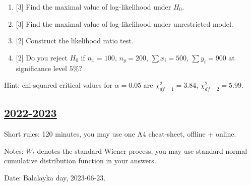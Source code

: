 \begin{enumerate}
    \begin{enumerate}
      \item {[3]} Find the maximal value of log-likelihood under $H_0$.
      \item {[3]} Find the maximal value of log-likelihood under unrestricted model.
      \item {[2]} Construct the likelihood ratio test. 
      \item {[2]} Do you reject $H_0$ if $n_x = 100$, $n_y = 200$, $\sum x_i = 500$, $\sum y_i = 900$ at
      significance level $5\%$?
    \end{enumerate}
  
    Hint: chi-squared critical values for $\alpha = 0.05$ are $\chi^2_{df=1} = 3.84$, $\chi^2_{df=2} = 5.99$.
  

\end{enumerate}




\subsection[2022-2023]{\hyperref[sec:sol_kr_04_2022_2023]{2022-2023}}
\label{sec:kr_04_2022_2023} %

Short rules: 120 minutes, you may use one A4 cheat-sheet, offline +  online.

Notes: $W_t$ denotes the standard Wiener process, 
you may use standard normal cumulative distribution function in your answers.

Date: Balalayka day, 2023-06-23.

